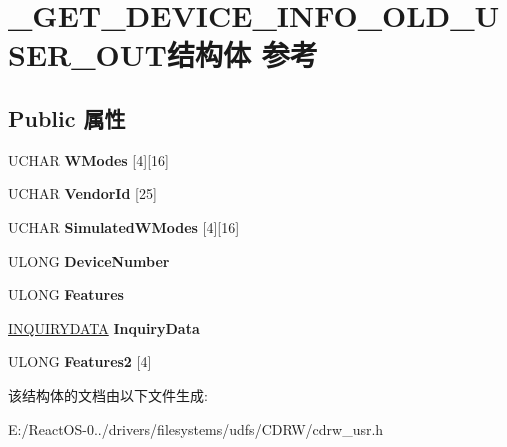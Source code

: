 \hypertarget{struct___g_e_t___d_e_v_i_c_e___i_n_f_o___o_l_d___u_s_e_r___o_u_t}{}\section{\+\_\+\+G\+E\+T\+\_\+\+D\+E\+V\+I\+C\+E\+\_\+\+I\+N\+F\+O\+\_\+\+O\+L\+D\+\_\+\+U\+S\+E\+R\+\_\+\+O\+U\+T结构体 参考}
\label{struct___g_e_t___d_e_v_i_c_e___i_n_f_o___o_l_d___u_s_e_r___o_u_t}
\subsection*{Public 属性}
\begin{DoxyCompactItemize}
\item 
\mbox{\label{struct___g_e_t___d_e_v_i_c_e___i_n_f_o___o_l_d___u_s_e_r___o_u_t_a5019c1dd3d87b13e771ac8a465a8a851}} 
U\+C\+H\+AR {\bfseries W\+Modes} \mbox{[}4\mbox{]}\mbox{[}16\mbox{]}
\item 
\mbox{\label{struct___g_e_t___d_e_v_i_c_e___i_n_f_o___o_l_d___u_s_e_r___o_u_t_ab42aab8e1baee9813146fa49b33aea5b}} 
U\+C\+H\+AR {\bfseries Vendor\+Id} \mbox{[}25\mbox{]}
\item 
\mbox{\label{struct___g_e_t___d_e_v_i_c_e___i_n_f_o___o_l_d___u_s_e_r___o_u_t_ae59b82676d9d0c15e4cc235f0de21ce1}} 
U\+C\+H\+AR {\bfseries Simulated\+W\+Modes} \mbox{[}4\mbox{]}\mbox{[}16\mbox{]}
\item 
\mbox{\label{struct___g_e_t___d_e_v_i_c_e___i_n_f_o___o_l_d___u_s_e_r___o_u_t_a3b177ff56879c1db80214241bc0f3aa1}} 
U\+L\+O\+NG {\bfseries Device\+Number}
\item 
\mbox{\label{struct___g_e_t___d_e_v_i_c_e___i_n_f_o___o_l_d___u_s_e_r___o_u_t_ade70314592ebda9afb3882cc98ec8fdf}} 
U\+L\+O\+NG {\bfseries Features}
\item 
\mbox{\label{struct___g_e_t___d_e_v_i_c_e___i_n_f_o___o_l_d___u_s_e_r___o_u_t_aa3159a86bfb90369f9b959c195dbadf1}} 
\hyperlink{struct___i_n_q_u_i_r_y_d_a_t_a}{I\+N\+Q\+U\+I\+R\+Y\+D\+A\+TA} {\bfseries Inquiry\+Data}
\item 
\mbox{\label{struct___g_e_t___d_e_v_i_c_e___i_n_f_o___o_l_d___u_s_e_r___o_u_t_a9b251dba513e52be402efe23d8564286}} 
U\+L\+O\+NG {\bfseries Features2} \mbox{[}4\mbox{]}
\end{DoxyCompactItemize}


该结构体的文档由以下文件生成\+:\begin{DoxyCompactItemize}
\item 
E\+:/\+React\+O\+S-\/0../drivers/filesystems/udfs/\+C\+D\+R\+W/cdrw\+\_\+usr.\+h\end{DoxyCompactItemize}
